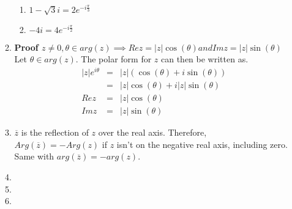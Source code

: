\documentclass{article}%
\newcommand\abs[1]{\left|#1\right|}
\newenvironment{proof}[1][]{\begin{samepage}\textbf{Proof #1} }{\end{samepage}}
\begin{document}
\begin{enumerate}
\begin{enumerate}[label*=\arabic*.]
\begin{enumerate}[label=\alph*]
            \item %
                $1-\sqrt{3}i=2e^{-i\frac{\pi}{3}}$
            \item %
                $-4i=4e^{-i\frac{\pi}{2}}$
        \end{enumerate}
        \item %
        \begin{proof}[$z \neq 0, \theta \in arg(z) \implies Re z=\abs{z}\cos(\theta) and Im z = \abs{z}\sin(\theta)$]
            Let $\theta \in arg(z)$.
            The polar form for $z$ can then be written as.
            \begin{eqnarray*}
                \abs{z} e^{i \theta} &=& \abs{z} (\cos(\theta) + i \sin(\theta)) \\
                                     &=& \abs{z} \cos(\theta) + i\abs{z}\sin(\theta) \\
                                Re z &=& \abs{z} \cos(\theta) \\
                                Im z &=& \abs{z} \sin(\theta)
            \end{eqnarray*}
        \end{proof}
        \item %
            $\overline{z}$ is the reflection of $z$ over the real axis.  Therefore, $Arg(\overline{z})=-Arg(z)$ if $z$ isn't on the negative real axis, including zero. Same with $arg(\overline{z})=-arg(z)$.
        \item %
        \item %
        \item %
    \end{enumerate}
\end{enumerate}
\end{document}
